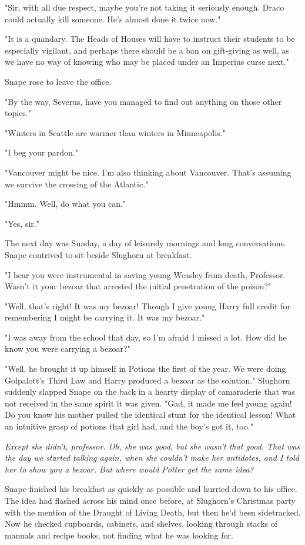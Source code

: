 \documentclass[a4paper,11pt]{article}
\begin{document}
"Sir, with all due respect, maybe you're not taking it seriously enough. Draco could actually kill someone. He's almost done it twice now."

"It is a quandary. The Heads of Houses will have to instruct their students to be especially vigilant, and perhaps there should be a ban on gift-giving as well, as we have no way of knowing who may be placed under an Imperius curse next."

Snape rose to leave the office.

"By the way, Severus, have you managed to find out anything on those other topics."

"Winters in Seattle are warmer than winters in Minneapolis."

"I beg your pardon."

"Vancouver might be nice. I'm also thinking about Vancouver. That's assuming we survive the crossing of the Atlantic."

"Hmmm. Well, do what you can."

"Yes, sir."

The next day was Sunday, a day of leisurely mornings and long conversations. Snape contrived to sit beside Slughorn at breakfast.

"I hear you were instrumental in saving young Weasley from death, Professor. Wasn't it your bezoar that arrested the initial penetration of the poison?"

"Well, that's right! It was my bezoar! Though I give young Harry full credit for remembering I might be carrying it. It was my bezoar."

"I was away from the school that day, so I'm afraid I missed a lot. How did he know you were carrying a bezoar?"

"Well, he brought it up himself in Potions the first of the year. We were doing Golpalott's Third Law and Harry produced a bezoar as the solution." Slughorn suddenly slapped Snape on the back in a hearty display of camaraderie that was not received in the same spirit it was given. "Gad, it made me feel young again! Do you know his mother pulled the identical stunt for the identical lesson! What an intuitive grasp of potions that girl had, and the boy's got it, too."

\emph{Except she didn't, professor. Oh, she was good, but she wasn't that good. That was the day we started talking again, when she couldn't make her antidotes, and I told her to show you a bezoar. But where would Potter get the same idea?}

Snape finished his breakfast as quickly as possible and hurried down to his office. The idea had flashed across his mind once before, at Slughorn's Christmas party with the mention of the Draught of Living Death, but then he'd been sidetracked. Now he checked cupboards, cabinets, and shelves, looking through stacks of manuals and recipe books, not finding what he was looking for.
\end{document}
